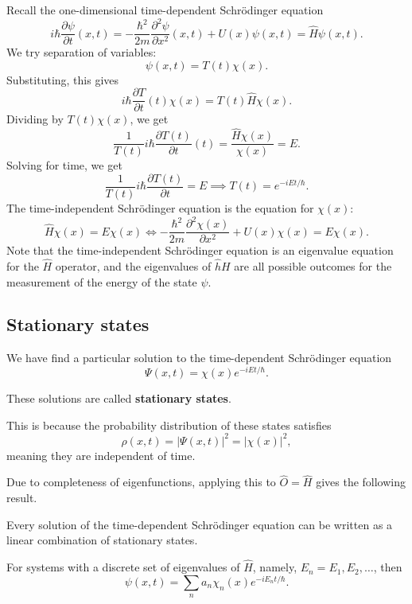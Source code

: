 \documentclass[12pt]{article}
\begin{document}
Recall the one-dimensional time-dependent Schr\"{o}dinger equation
\[
	i \hbar \frac{\partial \psi}{\partial t}(x, t) = -\frac{\hbar^2}{2m} \frac{\partial^2 \psi}{\partial x^2} (x, t) + U(x) \psi(x, t) = \hat H \psi(x, t)
.\] 
We try separation of variables:
\[
	\psi(x, t) = T(t) \chi(x)
.\]
Substituting, this gives
\[
	i \hbar \frac{\partial T}{\partial t}(t) \chi(x) = T(t) \hat H \chi(x)
.\]
Dividing by $T(t)\chi(x)$, we get
\[
	\frac{1}{T(t)} i \hbar \frac{\partial T (t)}{\partial t}(t) = \frac{\hat H \chi (x)}{\chi(x)} = E
.\]
Solving for time, we get
\[
	\frac{1}{T(t)} i \hbar \frac{\partial T(t)}{\partial t} = E \implies T(t) = e^{-i E t/\hbar}
.\]
The time-independent Schr\"{o}dinger equation is the equation for $\chi(x)$:
\[
	\hat H \chi(x) = E \chi(x) \iff - \frac{\hbar^2}{2m} \frac{\partial^2 \chi(x)}{\partial x^2} + U(x) \chi(x) = E \chi(x)
.\]
Note that the time-independent Schr\"{o}dinger equation is an eigenvalue equation for the $\hat H$ operator, and the eigenvalues of $\hat hH$ are all possible outcomes for the measurement of the energy of the state $\psi$.

\subsection{Stationary states}%
\label{sub:stationary_states}

We have find a particular solution to the time-dependent Schr\"{o}dinger equation
\[
	\Psi(x, t) = \chi(x) e^{-iEt/\hbar}
.\]

\begin{definition}
	These solutions are called \textbf{stationary states}.
\end{definition}

This is because the probability distribution of these states satisfies
\[
	\rho(x, t) = |\Psi(x, t)|^2 = |\chi(x)|^2
,\]
meaning they are independent of time.

Due to completeness of eigenfunctions, applying this to $\hat O = \hat H$ gives the following result.

\begin{theorem}
	Every solution of the time-dependent Schr\"{o}dinger equation can be written as a linear combination of stationary states.
\end{theorem}

For systems with a discrete set of eigenvalues of $\hat H$, namely, $E_n = E_1, E_2, \ldots$, then
\[
	\psi(x, t) = \sum_{n} a_n \chi_n(x) e^{-iE_n t/\hbar}
.\]
\end{document}
